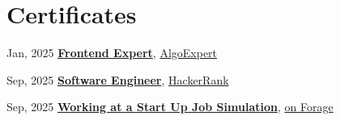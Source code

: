 \section{Certificates}

\begin{onecolentry}
    \begin{highlights}
        \item {
            \begin{twocolentry}{Jan, 2025}
                \textbf{\href{https://certificate.algoexpert.io/FE-4bc974c4cd}{Frontend Expert}}, \href{http://algoexpert.io}{AlgoExpert}
            \end{twocolentry}
            }
        \item {
            \begin{twocolentry}{Sep, 2025}
                \textbf{\href{https://www.hackerrank.com/certificates/iframe/a6f2e40be9b4}{Software Engineer}}, \href{http://algoexpert.io}{HackerRank}
            \end{twocolentry}
        }
        \item {
            \begin{twocolentry}{Sep, 2025}
                \textbf{\href{https://www.theforage.com}{Working at a Start Up Job Simulation}}, \href{https://www.theforage.com}{on Forage}
            \end{twocolentry}
        }
    \end{highlights}
\end{onecolentry}